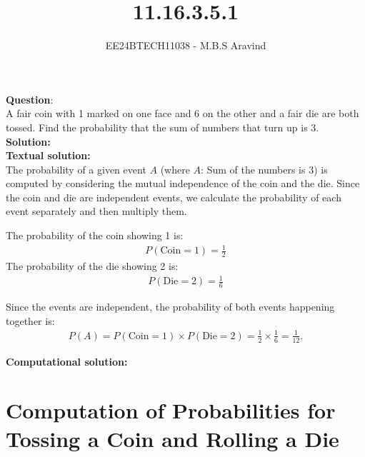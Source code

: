 \documentclass[journal]{IEEEtran}
\begin{document}

\vspace{3cm}

\title{11.16.3.5.1}
\author{EE24BTECH11038 - M.B.S Aravind}
{\let\newpage\relax\maketitle}

\renewcommand{\thefigure}{\theenumi}
\renewcommand{\thetable}{\theenumi}
\setlength{\intextsep}{10pt} %

\renewcommand{\thetable}{\theenumi}

\textbf{Question}:\\ 

A fair coin with 1 marked on one face and 6 on the other and a fair die are both tossed. Find the probability that the sum of numbers that turn up is 3.\\

\textbf{Solution: }\\
\textbf{Textual solution: }\\
The probability of a given event $A$ (where $A$: Sum of the numbers is 3) is computed by considering the mutual independence of the coin and the die. Since the coin and die are independent events, we calculate the probability of each event separately and then multiply them.

The probability of the coin showing 1 is:
\begin{align}
    P(\text{Coin} = 1) = \frac{1}{2}
\end{align}
The probability of the die showing 2 is:
\begin{align}
    P(\text{Die} = 2) = \frac{1}{6}
\end{align}

Since the events are independent, the probability of both events happening together is:
\begin{align}
    P(A) = P(\text{Coin} = 1) \times P(\text{Die} = 2) = \frac{1}{2} \times \frac{1}{6} = \frac{1}{12}.
\end{align}


\textbf{Computational solution: }
\section*{Computation of Probabilities for Tossing a Coin and Rolling a Die}
\end{document}

